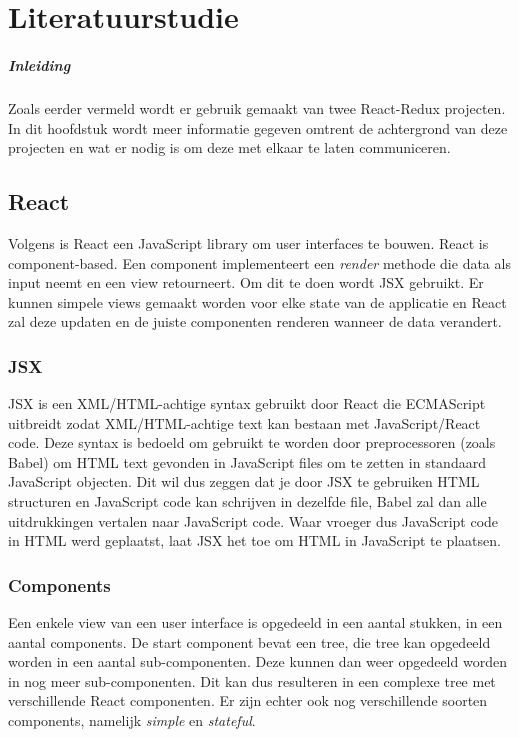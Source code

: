 \chapter{Literatuurstudie}
\label{ch:stand-van-zaken}


\paragraph{Inleiding}
Zoals eerder vermeld wordt er gebruik gemaakt van twee React-Redux projecten. In dit hoofdstuk wordt meer informatie gegeven omtrent de achtergrond van deze projecten en wat er nodig is om deze met elkaar te laten communiceren.

\section{React}
Volgens \autocite{React01} is React een JavaScript library om user interfaces te bouwen. React is component-based. Een component implementeert een \textit{render} methode die data als input neemt en een view retourneert. Om dit te doen wordt JSX gebruikt. Er kunnen simpele views gemaakt worden voor elke state van de applicatie en React zal deze updaten en de juiste componenten renderen wanneer de data verandert.

\subsection{JSX}
JSX is een XML/HTML-achtige syntax gebruikt door React die ECMAScript uitbreidt zodat XML/HTML-achtige text kan bestaan met JavaScript/React code. Deze syntax is bedoeld om gebruikt te worden door preprocessoren (zoals Babel) om HTML text gevonden in JavaScript files om te zetten in standaard JavaScript objecten. Dit wil dus zeggen dat je door JSX te gebruiken HTML structuren en JavaScript code kan schrijven in dezelfde file, Babel zal dan alle uitdrukkingen vertalen naar JavaScript code. Waar vroeger dus JavaScript code in HTML werd geplaatst, laat JSX het toe om HTML in JavaScript te plaatsen.
\autocite{jsx}

\subsection{Components}
Een enkele view van een user interface is opgedeeld in een aantal stukken, in een aantal components. De start component bevat een tree, die tree kan opgedeeld worden in een aantal sub-componenten. Deze kunnen dan weer opgedeeld worden in nog meer sub-componenten. Dit kan dus resulteren in een complexe tree met verschillende React componenten. Er zijn echter ook nog verschillende soorten components, namelijk \textit{simple} en \textit{stateful}. 
\autocite{jsx}

